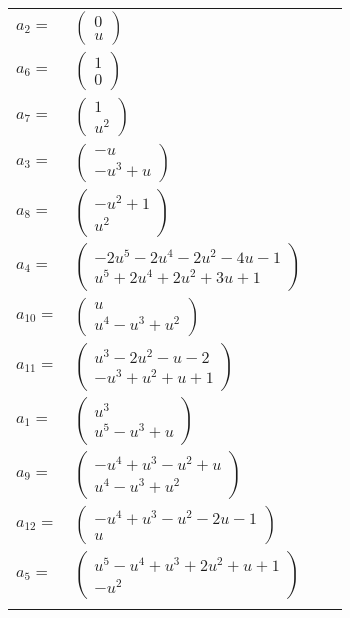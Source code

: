 \documentclass[1p]{elsarticle_modified}
\theoremstyle{definition}
\begin{document}
\begin{tabular}{m{7pt} m{180pt} m{7pt} m{180pt} }
\flushright $a_{2}=$&$\begin{pmatrix}0\\u\end{pmatrix}$ \\
\flushright $a_{6}=$&$\begin{pmatrix}1\\0\end{pmatrix}$ \\
\flushright $a_{7}=$&$\begin{pmatrix}1\\u^2\end{pmatrix}$ \\
\flushright $a_{3}=$&$\begin{pmatrix}- u\\- u^3+u\end{pmatrix}$ \\
\flushright $a_{8}=$&$\begin{pmatrix}- u^2+1\\u^2\end{pmatrix}$ \\
\flushright $a_{4}=$&$\begin{pmatrix}-2 u^5-2 u^4-2 u^2-4 u-1\\u^5+2 u^4+2 u^2+3 u+1\end{pmatrix}$ \\
\flushright $a_{10}=$&$\begin{pmatrix}u\\u^4- u^3+u^2\end{pmatrix}$ \\
\flushright $a_{11}=$&$\begin{pmatrix}u^3-2 u^2- u-2\\- u^3+u^2+u+1\end{pmatrix}$ \\
\flushright $a_{1}=$&$\begin{pmatrix}u^3\\u^5- u^3+u\end{pmatrix}$ \\
\flushright $a_{9}=$&$\begin{pmatrix}- u^4+u^3- u^2+u\\u^4- u^3+u^2\end{pmatrix}$ \\
\flushright $a_{12}=$&$\begin{pmatrix}- u^4+u^3- u^2-2 u-1\\u\end{pmatrix}$ \\
\flushright $a_{5}=$&$\begin{pmatrix}u^5- u^4+u^3+2 u^2+u+1\\- u^2\end{pmatrix}$\\&\end{tabular}
\end{document}
